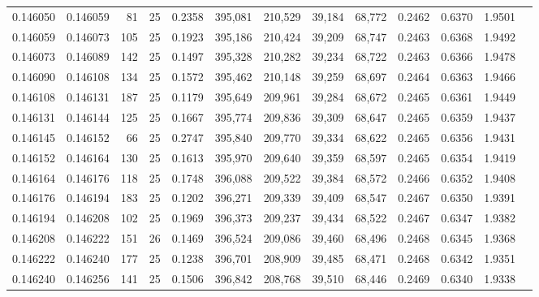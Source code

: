 \begin{tabular}{rrrrrrrrrrrrr}
0.146050 & 0.146059 &    81 &  25 &                                     0.2358 & 395,081 & 210,529 &  39,184 &  68,772 & 0.2462 & 0.6370 & 1.9501 \\
0.146059 & 0.146073 &   105 &  25 &                                     0.1923 & 395,186 & 210,424 &  39,209 &  68,747 & 0.2463 & 0.6368 & 1.9492 \\
0.146073 & 0.146089 &   142 &  25 &                                     0.1497 & 395,328 & 210,282 &  39,234 &  68,722 & 0.2463 & 0.6366 & 1.9478 \\
0.146090 & 0.146108 &   134 &  25 &                                     0.1572 & 395,462 & 210,148 &  39,259 &  68,697 & 0.2464 & 0.6363 & 1.9466 \\
0.146108 & 0.146131 &   187 &  25 &                                     0.1179 & 395,649 & 209,961 &  39,284 &  68,672 & 0.2465 & 0.6361 & 1.9449 \\
0.146131 & 0.146144 &   125 &  25 &                                     0.1667 & 395,774 & 209,836 &  39,309 &  68,647 & 0.2465 & 0.6359 & 1.9437 \\
0.146145 & 0.146152 &    66 &  25 &                                     0.2747 & 395,840 & 209,770 &  39,334 &  68,622 & 0.2465 & 0.6356 & 1.9431 \\
0.146152 & 0.146164 &   130 &  25 &                                     0.1613 & 395,970 & 209,640 &  39,359 &  68,597 & 0.2465 & 0.6354 & 1.9419 \\
0.146164 & 0.146176 &   118 &  25 &                                     0.1748 & 396,088 & 209,522 &  39,384 &  68,572 & 0.2466 & 0.6352 & 1.9408 \\
0.146176 & 0.146194 &   183 &  25 &                                     0.1202 & 396,271 & 209,339 &  39,409 &  68,547 & 0.2467 & 0.6350 & 1.9391 \\
0.146194 & 0.146208 &   102 &  25 &                                     0.1969 & 396,373 & 209,237 &  39,434 &  68,522 & 0.2467 & 0.6347 & 1.9382 \\
0.146208 & 0.146222 &   151 &  26 &                                     0.1469 & 396,524 & 209,086 &  39,460 &  68,496 & 0.2468 & 0.6345 & 1.9368 \\
0.146222 & 0.146240 &   177 &  25 &                                     0.1238 & 396,701 & 208,909 &  39,485 &  68,471 & 0.2468 & 0.6342 & 1.9351 \\
0.146240 & 0.146256 &   141 &  25 &                                     0.1506 & 396,842 & 208,768 &  39,510 &  68,446 & 0.2469 & 0.6340 & 1.9338 \\

\end{tabular}
